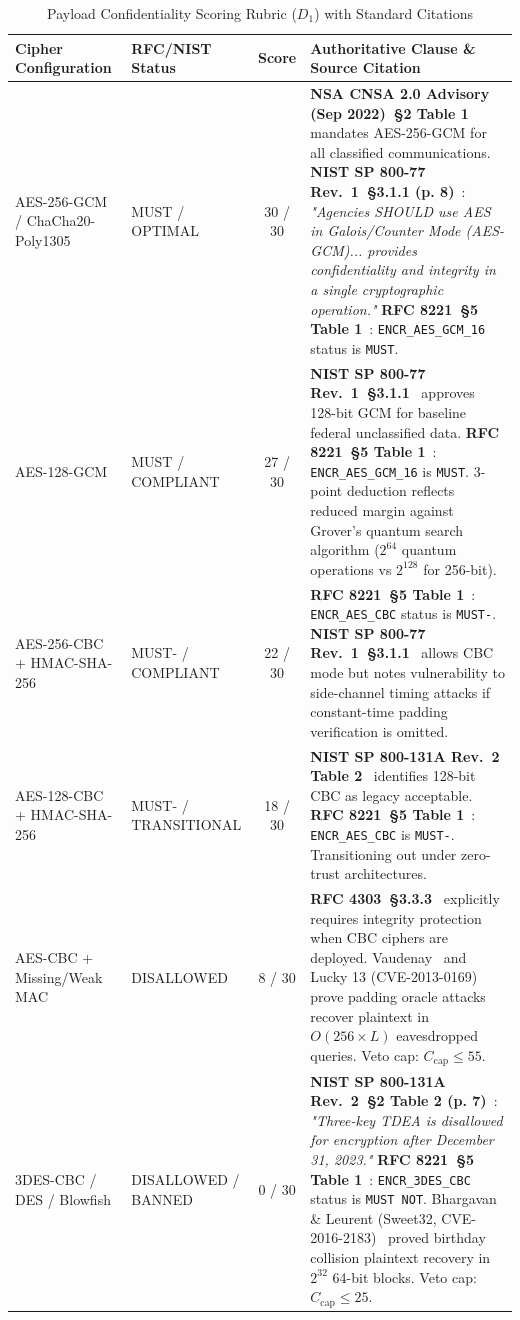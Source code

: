 \documentclass[11pt,a4paper]{article}
\begin{document}
\begin{table}[h!]
\centering
\small
\begin{tabularx}{\textwidth}{llcX}
\toprule
\textbf{Cipher Configuration} & \textbf{RFC/NIST Status} & \textbf{Score} & \textbf{Authoritative Clause \& Source Citation} \\
\midrule
AES-256-GCM / ChaCha20-Poly1305 & MUST / OPTIMAL & 30 / 30 & \textbf{NSA CNSA 2.0 Advisory (Sep 2022)~\S 2 Table 1}~\cite{cnsa2} mandates AES-256-GCM for all classified communications. \textbf{NIST SP 800-77 Rev.~1~\S 3.1.1 (p. 8)}~\cite{nist800-77r1}: \textit{"Agencies SHOULD use AES in Galois/Counter Mode (AES-GCM)... provides confidentiality and integrity in a single cryptographic operation."} \textbf{RFC 8221~\S 5 Table 1}~\cite{rfc8221}: \texttt{ENCR\_AES\_GCM\_16} status is \texttt{MUST}. \\
\addlinespace
AES-128-GCM & MUST / COMPLIANT & 27 / 30 & \textbf{NIST SP 800-77 Rev.~1~\S 3.1.1}~\cite{nist800-77r1} approves 128-bit GCM for baseline federal unclassified data. \textbf{RFC 8221~\S 5 Table 1}~\cite{rfc8221}: \texttt{ENCR\_AES\_GCM\_16} is \texttt{MUST}. 3-point deduction reflects reduced margin against Grover's quantum search algorithm ($2^{64}$ quantum operations vs $2^{128}$ for 256-bit). \\
\addlinespace
AES-256-CBC + HMAC-SHA-256 & MUST- / COMPLIANT & 22 / 30 & \textbf{RFC 8221~\S 5 Table 1}~\cite{rfc8221}: \texttt{ENCR\_AES\_CBC} status is \texttt{MUST-}. \textbf{NIST SP 800-77 Rev.~1~\S 3.1.1}~\cite{nist800-77r1} allows CBC mode but notes vulnerability to side-channel timing attacks if constant-time padding verification is omitted. \\
\addlinespace
AES-128-CBC + HMAC-SHA-256 & MUST- / TRANSITIONAL & 18 / 30 & \textbf{NIST SP 800-131A Rev.~2 Table 2}~\cite{nist800-131ar2} identifies 128-bit CBC as legacy acceptable. \textbf{RFC 8221~\S 5 Table 1}~\cite{rfc8221}: \texttt{ENCR\_AES\_CBC} is \texttt{MUST-}. Transitioning out under zero-trust architectures. \\
\addlinespace
AES-CBC + Missing/Weak MAC & DISALLOWED & 8 / 30 & \textbf{RFC 4303~\S 3.3.3}~\cite{rfc4303} explicitly requires integrity protection when CBC ciphers are deployed. Vaudenay~\cite{vaudenay2002} and Lucky 13 (CVE-2013-0169) prove padding oracle attacks recover plaintext in $O(256 \times L)$ eavesdropped queries. Veto cap: $C_{\text{cap}} \le 55$. \\
\addlinespace
3DES-CBC / DES / Blowfish & DISALLOWED / BANNED & 0 / 30 & \textbf{NIST SP 800-131A Rev.~2~\S 2 Table 2 (p. 7)}~\cite{nist800-131ar2}: \textit{"Three-key TDEA is disallowed for encryption after December 31, 2023."} \textbf{RFC 8221~\S 5 Table 1}~\cite{rfc8221}: \texttt{ENCR\_3DES\_CBC} status is \texttt{MUST NOT}. Bhargavan \& Leurent (Sweet32, CVE-2016-2183)~\cite{sweet32} proved birthday collision plaintext recovery in $2^{32}$ 64-bit blocks. Veto cap: $C_{\text{cap}} \le 25$. \\
\bottomrule
\end{tabularx}
\caption{Payload Confidentiality Scoring Rubric ($D_1$) with Standard Citations}
\label{tab:d1}
\end{table}
\end{document}
